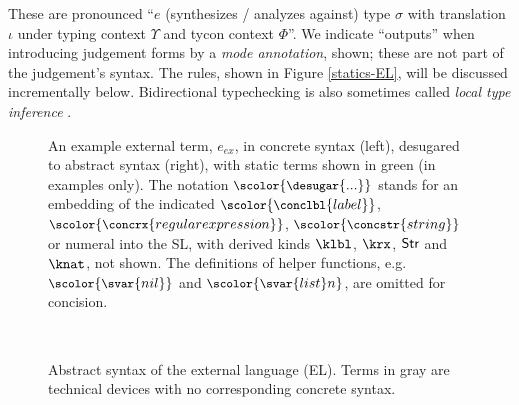 These are pronounced ``$e$ (synthesizes / analyzes against) type $\sigma$ with translation $\iota$ under typing context $\Upsilon$ and tycon context $\Phi$''. We indicate ``outputs'' when introducing judgement forms by a \emph{mode annotation}, shown; these are not part of the judgement's syntax. The rules, shown in Figure \ref{statics-EL}, will be discussed incrementally below.  Bidirectional typechecking is also sometimes called \emph{local type inference} \cite{Pierce:2000:LTI:345099.345100}. %
 \begin{figure*}[t!]
\footnotesize
\hspace{-60px}
\caption{An example external term, $e_{ex}$, in concrete syntax (left), desugared to abstract syntax (right), with static terms shown in green (in examples only). The notation ${\small \scolor{\desugar{...}}}$ stands for an embedding of the indicated ${\small \scolor{\conclbl{label}}}$, ${\small \scolor{\concrx{regular expression}}}$, ${\small \scolor{\concstr{string}}}$ or numeral into the SL, with derived kinds  $\klbl$, $\krx$,  $\textsf{Str}$ and $\knat$, not shown. The definitions of helper functions, e.g. ${\small \scolor{\svar{nil}}}$ and ${\small \scolor{\svar{list}n}}$, are omitted for concision.}
\label{example}
\end{figure*}
\begin{figure}[t]
\small
\hspace{-5px}\\
\caption{Abstract syntax of the external language (EL). Terms in gray are technical devices with no corresponding concrete syntax.}
\label{syntax-EL}
\end{figure}


